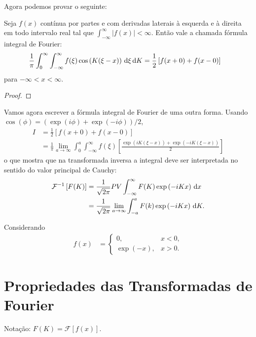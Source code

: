 Agora podemos provar o seguinte:
\begin{teo}
    Seja $f(x)$ contínua por partes e com derivadas laterais \`{a} esquerda
    e \`{a} direita em todo intervalo real tal que $\int_{-\infty}^\infty |f(x)|
    < \infty$. Então vale a chamada fórmula integral de  Fourier:
    \begin{align*}
        \frac{1}{\pi} \int_0^\infty \int_{-\infty}^\infty f(\xi) \cos\left(
        K(\xi - x) \right) \, \mathrm{d}\xi \, \mathrm{d}K &= \frac{1}{2} \left[ f(x + 0) + f(x
        - 0) \right]
    \end{align*}
    para $-\infty < x < \infty$.
\end{teo}
\begin{proof}
\end{proof}

Vamos agora escrever a fórmula integral de Fourier de uma outra forma.
Usando $\cos(\phi) = \left( \exp(i \phi) + \exp(-i \phi) \right) / 2$,
\begin{align*}
    I &= \frac{1}{2} \left[ f(x + 0) + f(x - 0) \right] \\
    &= \frac{1}{\pi} \lim_{a \to \infty} \int_0^a \int_{-\infty}^\infty f(\xi)
    \left[ \frac{\exp\left( i K(\xi - x) \right) + \exp\left( - i K(\xi - x)
    \right)}{2} \right]
\end{align*}
o que mostra que na transformada inversa a integral deve ser interpretada no
sentido do valor principal de Cauchy:
\begin{align*}
    \mathcal{F}^{-1}\left[ F(K) \right] &= \frac{1}{\sqrt{2 \pi}} PV
    \int_{-\infty}^\infty F(K) \exp\left( -i K x \right) \, \mathrm{d}x \\
    &= \frac{1}{\sqrt{2 \pi}} \lim_{a \to \infty} \int_{-a}^a F(k) \exp\left(
    -i K x \right) \, \mathrm{d}K.
\end{align*}
\begin{exem}
    Considerando
    \begin{align*}
        f(x) &= \begin{cases}
            0, & x < 0, \\
            \exp\left( -x \right), & x > 0.
        \end{cases}
    \end{align*}
\end{exem}

\section{Propriedades das Transformadas de Fourier}
Notação: $F(K) = \mathcal{F}\left[ f(x) \right]$.

